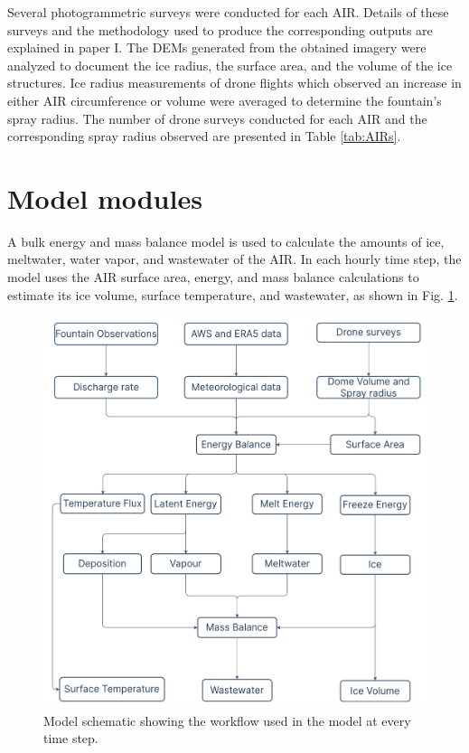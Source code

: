 Several photogrammetric surveys were conducted for each \ac{AIR}. Details of these surveys and the
methodology used to produce the corresponding outputs are explained in paper I. The
\ac{DEMs} generated from the obtained imagery were analyzed to document the ice radius, the surface area, and the
volume of the ice structures. Ice radius measurements of drone flights which observed an increase in either \ac{AIR}
circumference or volume were averaged to determine the fountain's spray radius. The number of drone surveys
conducted for each \Ac{AIR} and the corresponding spray radius observed are presented in Table \ref{tab:AIRs}.

\section{Model modules}
\label{sec:modules}

A bulk energy and mass balance model is used to calculate the amounts of ice, meltwater, water vapor, and
wastewater of the \ac{AIR}. In each hourly time step, the model uses the \ac{AIR} surface area, energy, and mass balance
calculations to estimate its ice volume, surface temperature, and wastewater, as shown in Fig. \ref{fig:schema}.

\begin{figure}
	\begin{center}
		\includegraphics[width=10 cm]{figs/model_schematic.jpg}
	\end{center}
	\caption{Model schematic showing the workflow used in the model at every time step. }
	\label{fig:schema}
\end{figure}


